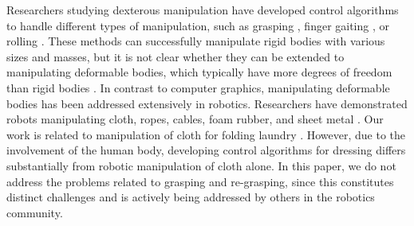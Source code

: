 


Researchers studying dexterous manipulation have developed control
algorithms to handle different types of manipulation, such as grasping
\cite{Pollard:2005:PBG,Kry:2006:ICS,Wang:2013:VHM,Zhao:2013:RRP}, finger
gaiting \cite{Ye:2012:SDH}, or rolling \cite{Bai:2014:DMU}. These methods
can successfully manipulate rigid bodies with various sizes and masses,
but it is not clear whether they can be extended to manipulating
deformable bodies, which typically have more degrees of freedom than rigid
bodies . In contrast to computer graphics, manipulating deformable bodies
has been addressed extensively in robotics. Researchers have demonstrated
robots manipulating cloth, ropes, cables, foam rubber, and sheet metal
\cite{Kosuge:1995:MFO,Wu:1995:AHC,Fahantidis:1997:RHF,Osawa:2007:UML,Cusumano:2011:BCD,Bersch:2011:BRC,Miller:2012:GAR}.
Our work is related to manipulation of cloth for folding laundry
\cite{Osawa:2007:UML,Cusumano:2011:BCD,Bersch:2011:BRC,Miller:2012:GAR} .
However, due to the involvement of the human body, developing control
algorithms for dressing differs substantially from robotic manipulation of
cloth alone. In this paper, we do not address the problems related to
grasping and re-grasping, since this constitutes distinct challenges and
is actively being addressed by others in the robotics community.



